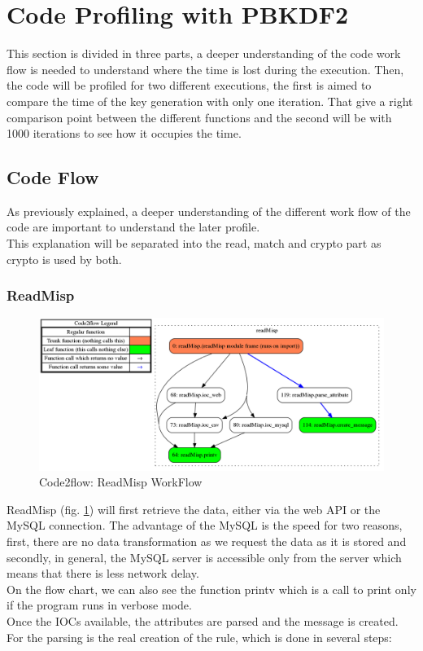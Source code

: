 \documentclass{eplmastersthesis}
\begin{document}
\section{Code Profiling with PBKDF2}

This section is divided in three parts, a deeper understanding of the code work flow is needed to understand where the time is lost during the execution. Then, the code will be profiled for two different executions, the first is aimed to compare the time of the key generation with only one iteration. That give a right comparison point between the different functions and the second will be with 1000 iterations to see how it occupies the time.


\subsection{Code Flow}
As previously explained, a deeper understanding of the different work flow of the code are important to understand the later profile.\\
This explanation will be separated into the read, match and crypto part as crypto is used by both.

\subsubsection{ReadMisp}
\begin{figure}[h!]
\begin{center}
	\includegraphics[scale=0.3]{res/flowReadMisp}
	\caption{Code2flow: ReadMisp WorkFlow}
	\label{code2flow-readMisp}
\end{center}
\end{figure}
ReadMisp (fig. \ref{code2flow-readMisp}) will first retrieve the data, either via the web API or the MySQL connection. The advantage of the MySQL is the speed for two reasons, first, there are no data transformation as we request the data as it is stored and secondly, in general, the MySQL server is accessible only from the server which means that there is less network delay.\\
On the flow chart, we can also see the function printv which is a call to print only if the program runs in verbose mode.\\
Once the IOCs available, the attributes are parsed and the message is created.\\
For the parsing is the real creation of the rule, which is done in several steps:
\end{document}
